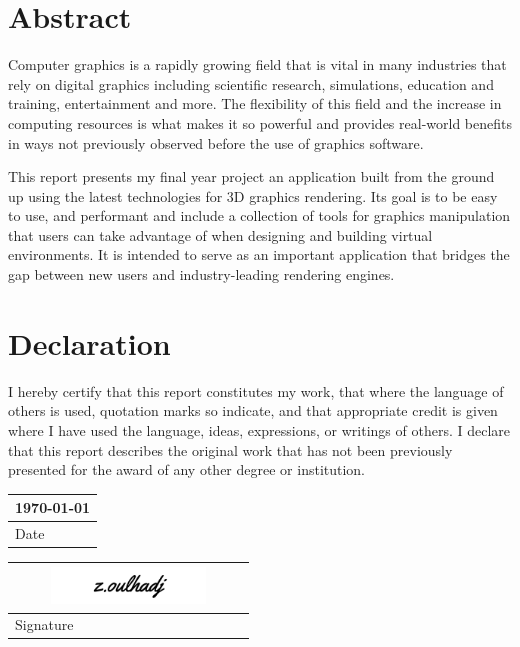 \documentclass[11pt]{article}
\begin{document}
\pagebreak

\section*{Abstract}
Computer graphics is a rapidly growing field that is vital in many industries
that rely on digital graphics including scientific research, simulations,
education and training, entertainment and more. The flexibility of this field
and the increase in computing resources is what makes it so powerful and
provides real-world benefits in ways not previously observed before the use of
graphics software.

This report presents my final year project an application built from the ground
up using the latest technologies for 3D graphics rendering. Its goal is to be
easy to use, and performant and include a collection of tools for graphics
manipulation that users can take advantage of when designing and building
virtual environments. It is intended to serve as an important application that
bridges the gap between new users and industry-leading rendering engines.

\pagebreak

\section*{Declaration}
I hereby certify that this report constitutes my work, that where the language
of others is used, quotation marks so indicate, and that appropriate credit is
given where I have used the language, ideas, expressions, or writings of others.
I declare that this report describes the original work that has not been
previously presented for the award of any other degree or institution.

\noindent
\begin{tabular}[b]{@{} p{6cm} @{}}
\today \\
\hline
\scriptsize Date
\end{tabular}\qquad
\begin{tabular}[b]{@{} p{6cm} @{}}
\includegraphics[width=6cm,height=1cm]{images/signature.png} \\
\hline
\scriptsize Signature
\end{tabular}

\pagebreak
\tableofcontents
{}
\pagebreak
\end{document}
